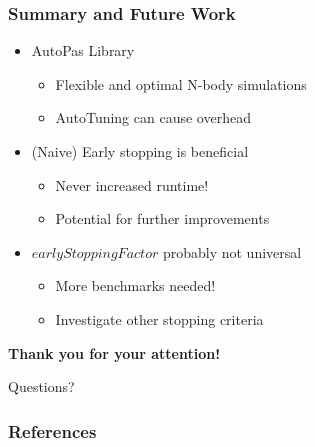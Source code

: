 \documentclass[
	10pt,
	t		%
]{beamer}
\begin{document}
\begin{frame}
    \frametitle{Summary and Future Work}

    \begin{itemize}
        \item AutoPas Library
              \begin{itemize}
                  \item Flexible and optimal N-body simulations
                  \item AutoTuning can cause overhead
              \end{itemize}
        \item (Naive) Early stopping is beneficial
              \begin{itemize}
                  \item Never increased runtime!
                  \item Potential for further improvements
              \end{itemize}
        \item $earlyStoppingFactor$ probably not universal
              \begin{itemize}
                  \item More benchmarks needed!
                  \item Investigate other stopping criteria
              \end{itemize}
    \end{itemize}
\end{frame}


\begin{frame}
    \begin{center}
        \vspace{1cm}
        {\large \textbf{Thank you for your attention!}}

        \vspace{2cm}

        \Huge{Questions?}
    \end{center}
\end{frame}




\begin{frame}
    \frametitle{References}
    \footnotesize
    
    
\end{frame}
\end{document}
